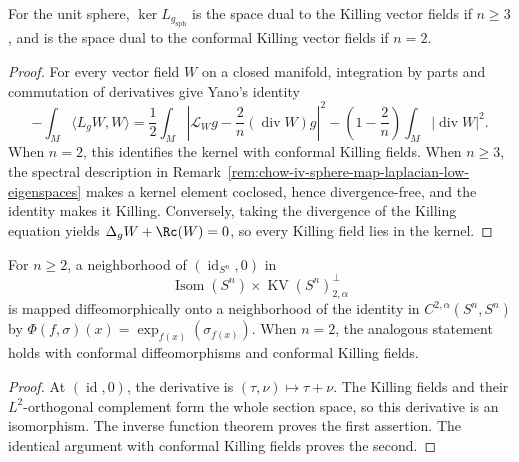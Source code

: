 \begin{lemma}
\label{lem:chow-iv-sphere-map-laplacian-kernel}
For the unit sphere, \(\ker L_{g_{\mathrm{sph}}}\) is the space dual to the
Killing vector fields if \(n\ge3\), and is the space dual to the conformal
Killing vector fields if \(n=2\).
\end{lemma}
\begin{proof}
\sketch
For every vector field \(W\) on a closed manifold, integration by parts and
commutation of derivatives give Yano's identity
\[
 -\int_M\langle L_gW,W\rangle
 =\frac12\int_M\left|\mathcal L_Wg-\frac2n(\operatorname{div}W)g\right|^2
  -\left(1-\frac2n\right)\int_M|\operatorname{div}W|^2.
\]
When \(n=2\), this identifies the kernel with conformal Killing fields.  When
\(n\ge3\), the spectral description in Remark~\ref{rem:chow-iv-sphere-map-laplacian-low-eigenspaces}
makes a kernel element coclosed, hence divergence-free, and the identity makes
it Killing.  Conversely, taking the divergence of the Killing equation yields
\(\Delta_gW+\Rc(W)=0\), so every Killing field lies in the kernel.
\end{proof}

\begin{lemma}
\label{lem:chow-iv-sphere-maps-near-identity-parametrization}
For \(n\ge2\), a neighborhood of \((\operatorname{id}_{S^n},0)\) in
\[
 \operatorname{Isom}(S^n)\times\operatorname{KV}(S^n)_{2,\alpha}^{\perp}
\]
is mapped diffeomorphically onto a neighborhood of the identity in
\(C^{2,\alpha}(S^n,S^n)\) by
\(\Phi(f,\sigma)(x)=\exp_{f(x)}(\sigma_{f(x)})\).  When \(n=2\), the analogous
statement holds with conformal diffeomorphisms and conformal Killing fields.
\end{lemma}
\begin{proof}
\sketch
At \((\operatorname{id},0)\), the derivative is
\((\tau,\nu)\mapsto\tau+\nu\).  The Killing fields and their \(L^2\)-orthogonal
complement form the whole section space, so this derivative is an isomorphism.
The inverse function theorem proves the first assertion.  The identical
argument with conformal Killing fields proves the second.
\end{proof}

